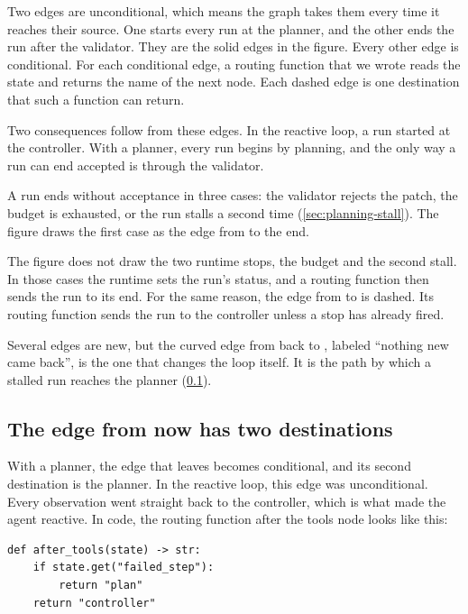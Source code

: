 Two edges are unconditional, which means the graph takes them every time it reaches their source.
One starts every run at the planner, and the other ends the run after the validator. They are the
solid edges in the figure. Every other edge is conditional. For each conditional edge, a routing
function that we wrote reads the state and returns the name of the next node. Each dashed edge is
one destination that such a function can return.

Two consequences follow from these edges. In the reactive loop, a run started at the controller.
With a planner, every run begins by planning, and the only way a run can end accepted is through the
validator.

A run ends without acceptance in three cases: the validator rejects the patch, the budget is
exhausted, or the run stalls a second time (\cref{sec:planning-stall}). The figure draws the first
case as the edge from  to the end.

The figure does not draw the two runtime stops, the budget and the second stall. In those cases the runtime sets the run's status, and
a routing function then sends the run to its end. For the same reason, the edge from 
to  is dashed. Its routing function sends the run to the controller unless a stop
has already fired.

Several edges are new, but the curved edge from  back to , labeled
``nothing new came back'', is the one that changes the loop itself. It is the path by which a stalled
run reaches the planner (\cref{sec:planning-tools-edge}).

\subsection{The edge from \texorpdfstring{}{tools} now has two destinations}
\label{sec:planning-tools-edge}

With a planner, the edge that leaves  becomes conditional, and its second destination
is the planner. In the reactive loop, this edge was unconditional. Every observation went straight
back to the controller, which is what made the agent reactive. In code, the routing function after
the tools node looks like this:

\begin{lstlisting}[basicstyle=\ttfamily\footnotesize, caption={Routing after the tools node
(illustrative).}, label=lst:planning-after-tools]
def after_tools(state) -> str:
    if state.get("failed_step"):
        return "plan"
    return "controller"
\end{lstlisting}

